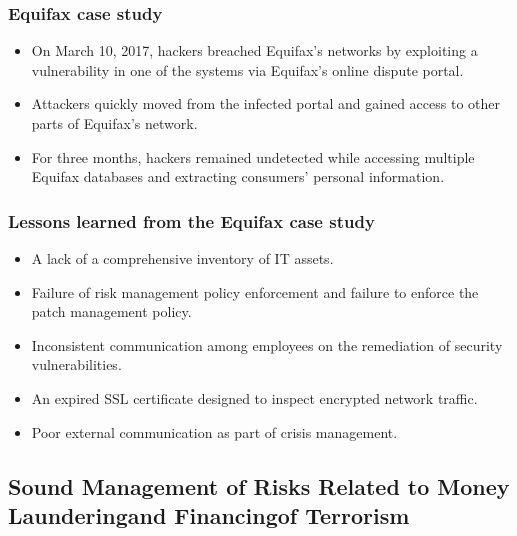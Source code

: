\subsubsection{Equifax case study}
\begin{itemize}
\item On March 10, 2017, hackers breached Equifax's networks by exploiting a vulnerability in one of the systems via Equifax's online dispute portal.
\item Attackers quickly moved from the infected portal and gained access to other parts of Equifax's network.
\item For three months, hackers remained undetected while accessing multiple Equifax databases and extracting consumers' personal information.
\end{itemize}




\subsubsection{Lessons learned from the Equifax case study}
\begin{itemize}
\item  A lack of a comprehensive inventory of IT assets.
\item  Failure of risk management policy enforcement and failure to enforce the patch management policy.
\item   Inconsistent communication among employees on the remediation of security vulnerabilities.
\item  An expired SSL certificate designed to inspect encrypted network traffic.
\item  Poor external communication as part of crisis management.

\end{itemize}




\subsection{ Sound Management of Risks Related to Money Launderingand Financingof Terrorism}





